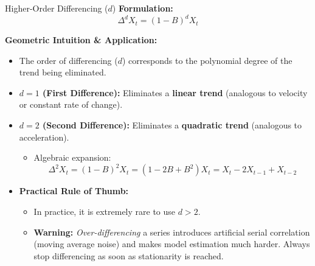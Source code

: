 \documentclass[aspectratio=169]{beamer}
\begin{document}
\begin{frame}{Higher-Order Differencing ($d$)}
\textbf{Formulation:}
\[
\Delta^d X_t = (1 - B)^d X_t
\]

\textbf{Geometric Intuition \& Application:}
\begin{itemize}
    \item The order of differencing ($d$) corresponds to the polynomial degree of the trend being eliminated.
    \vspace{0.2cm}
    \item \textbf{$d=1$ (First Difference):} Eliminates a \textbf{linear trend} (analogous to velocity or constant rate of change).
    \item \textbf{$d=2$ (Second Difference):} Eliminates a \textbf{quadratic trend} (analogous to acceleration).
    \begin{itemize}
        \item Algebraic expansion: 
        \[ \Delta^2 X_t = (1 - B)^2 X_t = (1 - 2B + B^2) X_t = X_t - 2X_{t-1} + X_{t-2} \]
    \end{itemize}
    \vspace{0.3cm}
    \item \textbf{Practical Rule of Thumb:}
    \begin{itemize}
        \item In practice, it is extremely rare to use $d > 2$.
        \item \textbf{Warning:} \textit{Over-differencing} a series introduces artificial serial correlation (moving average noise) and makes model estimation much harder. Always stop differencing as soon as stationarity is reached.
    \end{itemize}
\end{itemize}
\end{frame}
\end{document}
